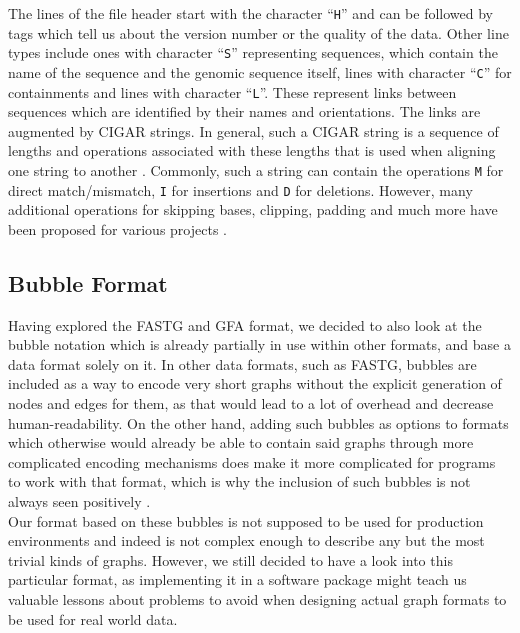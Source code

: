 \documentclass[a4paper,12pt,twoside,BCOR=10mm]{scrbook}
\begin{document}
The lines of the file header start with the character “\texttt{H}” and can be followed by tags which tell us about the
version number or the quality of the data.
Other line types include ones with character “\texttt{S}” representing sequences, which
contain the name of the sequence and the genomic sequence itself,
lines with character “\texttt{C}” for containments
and lines with character “\texttt{L}”.
These represent links between sequences which are identified by their names and orientations.
The links are augmented by CIGAR strings.
In general, such a CIGAR string is a sequence of lengths and operations
associated with these lengths that is used when aligning one string to another \citep{specSAM}.
Commonly, such a string can contain the operations \texttt{M} for direct match/mismatch,
\texttt{I} for insertions and \texttt{D} for deletions.
However, many additional operations for skipping bases,
clipping, padding and much more have been proposed
for various projects \citep{specGFA1,SAM2009}.

\subsection{Bubble Format}

Having explored the FASTG and GFA format, we decided to also look
at the bubble notation which is already partially in use within other formats,
and base a data format solely on it.
In other data formats, such as FASTG, bubbles are included as a way to encode very short graphs
without the explicit generation of nodes and edges for them,
as that would lead to a lot of overhead and decrease human-readability.
On the other hand, adding such bubbles as options to formats which otherwise
would already be able to contain said graphs through more complicated encoding mechanisms
does make it more complicated for programs to work with that format, which is why the inclusion
of such bubbles is not always seen positively \citep{specGFA1}. \\
Our format based on these bubbles
is not supposed to be used for production environments and indeed
is not complex enough to describe any but the most trivial kinds of graphs.
However, we still decided to have a look into this particular format,
as implementing it in a software package might teach us valuable lessons
about problems to avoid when designing actual graph formats to be used for real world data.
\end{document}
